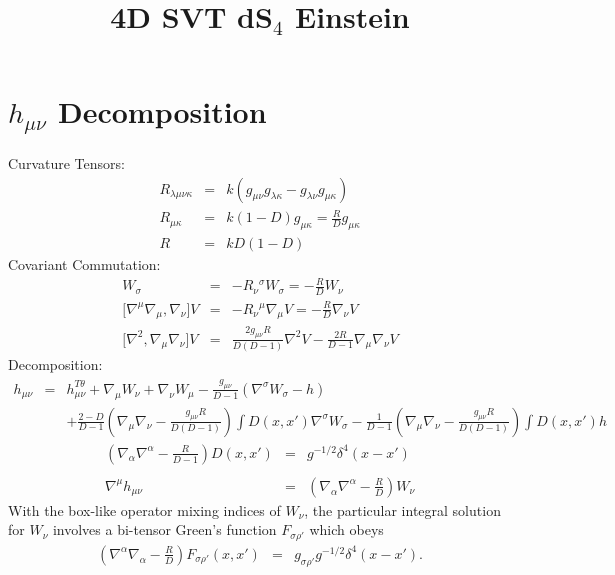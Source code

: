 \documentclass[10pt,letterpaper]{article}
\title{4D SVT dS${}_4$ Einstein}
\date{}
\numberwithin{equation}{section}
\begin{document}
 
\maketitle
\noindent 
\section{$h_{\mu\nu}$ Decomposition}
Curvature Tensors:
\begin{eqnarray}
R_{\lambda\mu\nu\kappa} &=& k(g_{\mu\nu}g_{\lambda\kappa}-g_{\lambda\nu}g_{\mu\kappa})
\nonumber\\
R_{\mu\kappa} &=& k(1-D)g_{\mu\kappa} = \frac{R}{D}g_{\mu\kappa}
\nonumber\\
R&=& kD(1-D) 
\end{eqnarray}
Covariant Commutation:
\begin{eqnarray}
[\nabla^\sigma \nabla_\nu] W_\sigma &=& -R_{\nu}{}^\sigma W_\sigma = -\frac{R}{D}W_\nu
\nonumber\\
{[}\nabla^\mu \nabla_\mu, \nabla_\nu] V &=& -R_{\nu}{}^\mu \nabla_\mu V = -\frac{R}{D}\nabla_\nu V
\nonumber\\
{[}\nabla^2,\nabla_\mu\nabla_\nu]V &=& \frac{2 g_{\mu\nu}R}{D(D-1)}\nabla^2 V - \frac{2R}{D-1}\nabla_\mu\nabla_\nu V
\label{comms}
\end{eqnarray}
Decomposition:
\begin{eqnarray}
h_{\mu\nu} &=& h_{\mu\nu}^{T\theta} + \nabla_\mu W_\nu + \nabla_\nu W_\mu - \frac{g_{\mu\nu}}{D-1}(\nabla^\sigma W_\sigma - h)
\nonumber\\
&& +\frac{2-D}{D-1}\left( \nabla_\mu\nabla_\nu -\frac{ g_{\mu\nu}R}{D(D-1)}\right) \int D(x,x') \nabla^\sigma W_\sigma
-\frac{1}{D-1}\left( \nabla_\mu\nabla_\nu -\frac{g_{\mu\nu}R}{D(D-1)}\right) \int D(x,x') h
\label{decomph}
\end{eqnarray}
\begin{eqnarray}
\left( \nabla_\alpha \nabla^\alpha - \frac{R}{D-1}\right)D(x,x') &=& g^{-1/2}\delta^4 (x-x')
\nonumber\\ \nonumber\\
\nabla^\mu h_{\mu\nu} &=& \left( \nabla_\alpha\nabla^\alpha-\frac{R}{D} \right) W_\nu
\end{eqnarray}
With the box-like operator mixing indices of $W_\nu$, the particular integral solution for $W_\nu$ involves a bi-tensor Green's function $F_{\sigma\rho'}$ which obeys
\begin{eqnarray}
\left( \nabla^\alpha\nabla_\alpha -\frac{R}{D}\right) F_{\sigma\rho'}(x,x') &=& g_{\sigma\rho'}g^{-1/2} \delta^4(x-x').
\label{fgreen}
\end{eqnarray}
\end{document}
